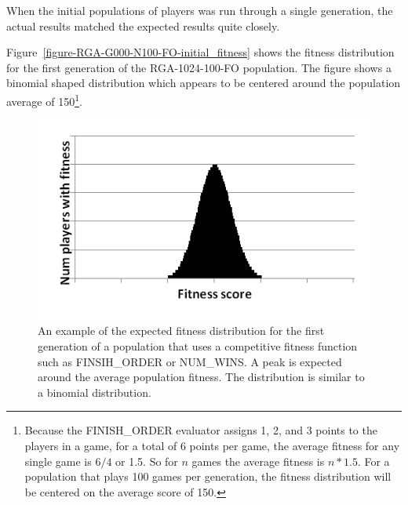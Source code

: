 When the initial populations of players was run through a single generation, the
actual results matched the expected results quite closely.

Figure~\ref{figure-RGA-G000-N100-FO-initial_fitness} shows the fitness
distribution for the first generation of the RGA-1024-100-FO population. The
figure shows a binomial shaped distribution which appears to be centered around
the population average of 150\footnote{Because the FINISH\_ORDER evaluator
assigns 1, 2, and 3 points to the players in a game, for a total of 6 points per
game, the average fitness for any single game is \(6/4\) or 1.5. So for \(n\)
games the average fitness is \(n * 1.5\). For a population that plays 100 games
per generation, the fitness distribution will be centered on the average score
of 150.}.

\begin{figure}
\centering
\begin{minipage}[t]{0.47\linewidth}
\centering
\includegraphics[width=1.0\linewidth]{Figures/binomial.png}
\caption[Binomial Distribution]{An example of the expected fitness distribution
for the first generation of a population that uses a competitive fitness
function such as FINSIH\_ORDER or NUM\_WINS. A peak is expected around the
average population fitness. The distribution is similar to a binomial
distribution.}
\label{figure-binomial}
\end{minipage}%
\hspace{0.06\linewidth}%
\begin{minipage}[t]{0.47\linewidth}
\centering

\end{minipage}
\end{figure}
